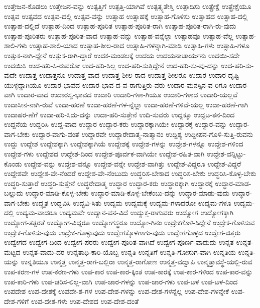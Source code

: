 {ಉತ್ತೇಜನ-ಕೊಡಲು
ಉತ್ತೇಜನ-ವನ್ನು
ಉತ್ಪತ್ತಿಗೆ
ಉತ್ಪತ್ತಿ-ಯಾಗಿವೆ
ಉತ್ಪತ್ಸ್ಯತೇಸ್ತಿ
ಉತ್ಪಾದಿಸು
ಉತ್ಪ್ರೇಕ್ಷೆ
ಉತ್ಪ್ರೇಕ್ಷೆಯೂ
ಉತ್ಸವ
ಉತ್ಸವದ
ಉತ್ಸವ-ದಲ್ಲಿ
ಉತ್ಸವ-ವನ್ನು
ಉತ್ಸಾಹ
ಉತ್ಸಾಹಕ್ಕೆ
ಉತ್ಸಾಹ-ಗೊಳಿಸು
ಉತ್ಸಾಹದ
ಉತ್ಸಾಹ-ದಲ್ಲಿ
ಉತ್ಸಾಹ-ದಲ್ಲಿದೆ
ಉತ್ಸಾಹ-ದಿಂದ
ಉತ್ಸಾಹ-ಪೂರಿತ
ಉತ್ಸಾಹ-ಪೂರಿತ-ರಾಗಿ
ಉತ್ಸಾಹ-ಪೂರಿತ-ರಾಗಿ-ರು-ವುದು
ಉತ್ಸಾಹ-ಪೂರಿತರು
ಉತ್ಸಾಹ-ಪೂರಿತ-ವಾದ
ಉತ್ಸಾಹ-ವನ್ನು
ಉತ್ಸಾಹ-ವನ್ನೆಲ್ಲಾ
ಉತ್ಸಾಹವೂ
ಉತ್ಸಾಹ-ವೆಲ್ಲ
ಉತ್ಸಾಹ-ಶಾಲಿ-ಗಳು
ಉತ್ಸಾಹ-ಶಾಲಿ-ಯಾದ
ಉತ್ಸಾಹ-ಶೀಲ-ರಾದ
ಉತ್ಸಾಹಿ-ಗಳನ್ನಾಗಿ-ಮಾಡಿ
ಉತ್ಸಾಹಿ-ಗಳು
ಉತ್ಸಾಹಿ-ಗಳೂ
ಉತ್ಸುಕ-ನಾಗಿ-ದ್ದೇನೆ
ಉತ್ಸುಕ-ರಾಗಿ-ದ್ದಾರೆ
ಉದಕ-ಮಂಡಲಕ್ಕೆ
ಉದಯ
ಉದಯನಾಚಾರ್ಯನು
ಉದಯಿ-ಸದೇ
ಉದಯಿಸಿ
ಉದ-ಹರಿ-ಸಿ-ರುವರೋ
ಉದ-ಹರಿ-ಸಿಲ್ಲ
ಉದ-ಹರಿ-ಸುತ್ತಿದ್ದೇನೆ
ಉದ-ಹರಿ-ಸು-ವು-ದನ್ನು
ಉದ-ಹರಿ-ಸು-ವುದೇ
ಉದಾತ್ತ
ಉದಾತ್ತನೂ
ಉದಾತ್ತ-ವಾದ
ಉದಾತ್ತ-ಶೀಲ-ರಾದ
ಉದಾತ್ತ-ಶೀಲರೂ
ಉದಾರ
ಉದಾರ-ದೃಷ್ಟಿ-ಯುಳ್ಳದ್ದಾಗಿಯೂ
ಉದಾರ-ಭಾವದ
ಉದಾರ-ಭಾವ-ದ-ವ-ರಾಗುತ್ತಿರು-ವರು
ಉದಾರ-ಮನಸ್ಸಿನ-ವ-ರಿಗೂ
ಉದಾರ-ವಾಗಿ
ಉದಾರ-ವಾದ
ಉದಾರಸ್ವ-ಭಾವದ
ಉದಾರಿ
ಉದಾರಿ-ಗಳಾ-ಗಿಯೂ
ಉದಾರಿ-ಗಳಾದ
ಉದಾರಿ-ಯಲ್ಲವೆ
ಉದಾಸೀನ-ನಾಗಿ-ರುವೆ
ಉದಾ-ಹರಣೆ
ಉದಾ-ಹರಣೆ-ಗಳ-ನ್ನೆಲ್ಲಾ
ಉದಾ-ಹರಣೆ-ಗಳಿವೆ-ಯಲ್ಲ
ಉದಾ-ಹರಣೆ-ಗಾಗಿ
ಉದಾಹರ-ಣೆಗೆ
ಉದಾ-ಹರಿ-ಸಿದು-ದನ್ನು
ಉದಾ-ಹರಿ-ಸುತ್ತೇನೆ
ಉದಿ-ಸುವರು
ಉದ್ದಕ್ಕೂ
ಉದ್ದಟ-ತನ-ದಿಂದ
ಉದ್ದನೆಯ
ಉದ್ದರಿಸಿ
ಉದ್ದ-ವಾದ
ಉದ್ದಾರ
ಉದ್ದಾರ-ಕರು
ಉದ್ದಾರಕ್ಕಾಗಿಯೇ
ಉದ್ದಾರಕ್ಕೆ
ಉದ್ದಾರ-ವನ್ನು
ಉದ್ದಾರ-ವಾಗ-ಬೇಕು
ಉದ್ದಾರ-ವಾಗು-ವಂತೆ
ಉದ್ದಾರವೇ
ಉದ್ದಾರೇದಾತ್ಮ-ನಾತ್ಮಾನಂ
ಉದ್ದಿಶ್ಯ
ಉದ್ದೀಪನ-ಗೊಳಿ-ಸುತ್ತಿ-ರುವನು
ಉದ್ದು
ಉದ್ದೇಶ
ಉದ್ದೇಶಕ್ಕಾಗಿ
ಉದ್ದೇಶಕ್ಕಾಗಿಯೆ
ಉದ್ದೇಶಕ್ಕೆ
ಉದ್ದೇಶ-ಗಳನ್ನು
ಉದ್ದೇಶ-ಗಳನ್ನೂ
ಉದ್ದೇಶ-ಗಳಿಂದ
ಉದ್ದೇಶ-ಗಳು
ಉದ್ದೇಶದ
ಉದ್ದೇಶ-ದಿಂದ
ಉದ್ದೇಶ-ಪೂರ್ವಕ-ವಾಗಿಯೇ
ಉದ್ದೇಶ-ರಹಿತ-ವಾಗಿ
ಉದ್ದೇಶ-ವನ್ನಿಟ್ಟು-ಕೊಂಡು
ಉದ್ದೇಶ-ವನ್ನು
ಉದ್ದೇಶ-ವನ್ನೂ
ಉದ್ದೇಶ-ವನ್ನೇ
ಉದ್ದೇಶ-ವಾಗಿತ್ತು
ಉದ್ದೇಶ-ವಿದ್ದರೂ
ಉದ್ದೇಶ-ವಿದ್ದರೆ
ಉದ್ದೇಶವೇ
ಉದ್ದೇಶ-ವೇ-ನೆಂದರೆ
ಉದ್ದೇಶ-ವೇ-ನೆಂಬುದು
ಉದ್ಧರಿಸ-ಬೇಕಾದ
ಉದ್ಧರಿಸ-ಬೇಕು
ಉದ್ಧರಿಸಿ-ಕೊಳ್ಳ-ಬೇಕು
ಉದ್ಧರಿ-ಸುತ್ತಾರೆ
ಉದ್ಧರಿ-ಸುತ್ತೇನೆ
ಉದ್ಧರೇದಾತ್ಮ
ಉದ್ಧಾರ
ಉದ್ಧಾರ-ಕರು
ಉದ್ಧಾರಕ್ಕಾಗಿ
ಉದ್ಧಾರಕ್ಕೆ
ಉದ್ಧಾರ-ಮಾಡ-ಬಲ್ಲುದು
ಉದ್ಧಾರ-ಮಾಡಿ-ಕೊಳ್ಳ-ಬೇಕು
ಉದ್ಧಾರ-ಮಾಡಿ-ಕೊಳ್ಳ-ಬೇಕೆಂಬು-ದನ್ನು
ಉದ್ಧಾರ-ಮಾಡು-ವುದು
ಉದ್ಧಾರ-ವಾಗ-ಬೇಕು
ಉದ್ಧೃತ
ಉದ್ಭವಿಸಿ
ಉದ್ಭವಿ-ಸಿತು
ಉದ್ಯಮ
ಉದ್ಯಮಕ್ಕೆ
ಉದ್ಯಮ-ಗಳಾದರೋ
ಉದ್ಯಮ-ಗಳೂ
ಉದ್ಯಮ-ದಲ್ಲಿ
ಉದ್ಯಮ-ವಾದರೂ
ಉದ್ಯಮವೇ
ಉದ್ಯಾನ-ವನ-ವಿದೆ
ಉದ್ಯುಕ್ತ-ರಾಗುವರು
ಉದ್ಯೋಗ
ಉದ್ಯೋಗಕ್ಕಾಗಿ
ಉದ್ಯೋಗ-ತತ್ಪರತೆ
ಉದ್ಯೋಗ-ವಿದ್ದರೂ
ಉದ್ಯೋಗಸ್ಥರೂ
ಉದ್ಯೋ-ಗಿನಂ
ಉದ್ರೇಕಗೊಳಿ-ಸಿದ್ದೇನೆ
ಉದ್ರೇಕ-ಗೊಳಿಸುವ
ಉದ್ರೇಕ-ಗೊಳಿಸು-ವುದು
ಉದ್ರೇಕ-ಗೊಳ್ಳುವುದು
ಉದ್ವೇಗಕ್ಕೊಳಗಾಗು-ವುದು
ಉದ್ವೇಗಗೊಳ್ಳದ
ಉದ್ವೇಗ-ಚಿತ್ತರು
ಉದ್ವೇಗದ
ಉದ್ವೇಗ-ದಿಂದ
ಉದ್ವೇಗ-ಪರರು
ಉದ್ವೇಗ-ಪೂರಿತ-ವಾಗಿದೆ
ಉದ್ವೇಗ-ಪೂರ್ಣ-ವಾದುದು
ಉನ್ನತ
ಉನ್ನತ-ಮಟ್ಟದ
ಉನ್ನತ-ವಾದು-ದರ
ಉನ್ನತಾಧಿ-ಕಾರಿ-ಯೊಬ್ಬ
ಉನ್ನತಿ
ಉನ್ನತಿಗೆ
ಉನ್ನತಿ-ಗೋಸುಗ-ವಾಗಿ
ಉನ್ನತಿಯ
ಉನ್ನತಿ-ಯನ್ನು
ಉನ್ನತಿಯೂ
ಉನ್ಮತ್ತ
ಉನ್ಮತ್ತ-ರಾಗ-ಬಲ್ಲಿರಾ
ಉನ್ಮತ್ತ-ರಾಗೋಣ
ಉನ್ಮತ್ತ-ವದ್ವಾಪಿ
ಉನ್ಮತ್ತಾವಸ್ಥೆ-ಯಲ್ಲಿ-ರುವ
ಉಪ-ಕರಣ-ಗಳ
ಉಪ-ಕರಣ-ಗಳು
ಉಪ-ಕಾರ
ಉಪ-ಕಾರ-ಕ್ಕಿಂತ
ಉಪ-ಕಾರಕ್ಕೆ
ಉಪ-ಕಾರ-ಗಳಿಂದ
ಉಪ-ಕಾರ-ವನ್ನು
ಉಪ-ಕಾರಿ-ಗಳು
ಉಪ-ಚರಿಸ-ಲಿಲ್ಲ-ವಾಗಿ
ಉಪ-ಚಾರ-ಗಳನ್ನು
ಉಪ-ಚಾರ-ಗಳು
ಉಪ-ಟಳ
ಉಪ-ಟಳ-ದಿಂದ
ಉಪದೇಶ
ಉಪ-ದೇಶಕ್ಕೆ
ಉಪದೇ-ಶ-ಗಳ
ಉಪ-ದೇಶ-ಗಳನ್ನು
ಉಪ-ದೇಶ-ಗಳನ್ನೆಲ್ಲ
ಉಪ-ದೇಶ-ಗಳನ್ನೇಕೆ
ಉಪ-ದೇಶ-ಗಳಿಗೆ
ಉಪ-ದೇಶ-ಗಳು
ಉಪ-ದೇಶದ
ಉಪ-ದೇಶ-ದಂತೆ
}
